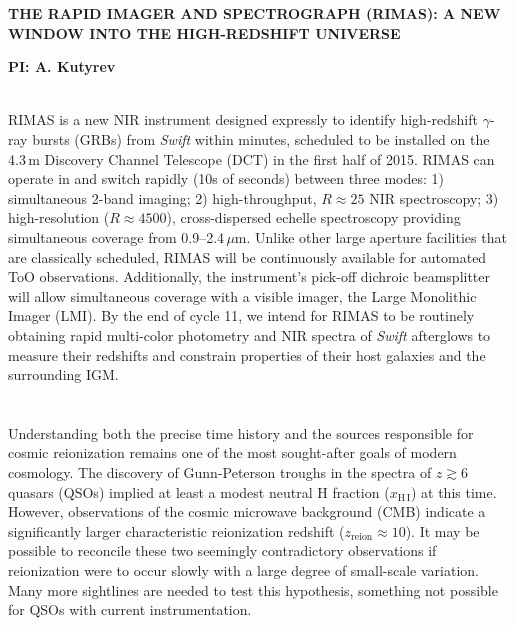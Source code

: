 \documentclass[letterpaper,11pt]{article}
\begin{document}
\pagestyle{plain}

\begin{center} 
\bfseries\uppercase{The Rapid IMAger and Spectrograph (RIMAS): A New Window
	into the High-Redshift Universe}
\end{center}
\vspace{-0.3cm}
\centerline{\bf PI: {A. Kutyrev}}
 
\smallskip\\
RIMAS is a new NIR instrument designed expressly to identify high-redshift 
$\gamma$-ray bursts (GRBs) from \textit{Swift} within minutes, scheduled to be installed on the 
4.3\,m Discovery Channel Telescope (DCT) in the first half of 2015. RIMAS can operate in and switch 
rapidly (10s of seconds) between three modes: 1) simultaneous 2-band imaging; 2) high-throughput, $R \approx 25$ 
NIR spectroscopy; 3) high-resolution ($R \approx 4500$), cross-dispersed echelle spectroscopy providing 
simultaneous coverage from 0.9--2.4\,$\mu$m. Unlike other large aperture facilities that 
are classically scheduled, RIMAS will be continuously available for automated ToO observations. 
Additionally, the instrument's pick-off dichroic beamsplitter will allow simultaneous coverage with a visible imager, 
the Large Monolithic Imager (LMI). By the end of cycle 11, we intend for RIMAS to be routinely 
obtaining rapid multi-color photometry and NIR spectra of \textit{Swift} afterglows to measure 
their redshifts and constrain properties of their host galaxies and the surrounding 
IGM. \\

\smallskip\\
\smallskip\\
Understanding both the precise time history and the sources responsible for cosmic
reionization remains one of the most sought-after goals of modern cosmology.  The 
discovery of Gunn-Peterson troughs in the spectra of $z \gtrsim 6$ quasars 
(QSOs\cite{bfw+01}) implied at least a modest neutral H fraction 
($x_{\mathrm{H\,I}}$) at this time.  However, observations of the cosmic microwave
background (CMB\cite{hlk+13}) indicate a significantly larger characteristic reionization 
redshift ($z_\mathrm{reion} \approx 10$).  It may be 
possible to reconcile these two seemingly contradictory observations if reionization
were to occur slowly with a large degree of small-scale variation.  Many more
sightlines are needed to test this hypothesis, something not possible for QSOs
with current instrumentation.
\end{document}
